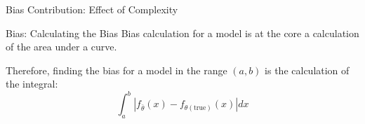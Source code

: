\documentclass{beamer}
\begin{document}
\begin{frame}{Bias Contribution: Effect of Complexity}
\end{frame}

\begin{frame}{Bias: Calculating the Bias}
Bias calculation for a model is at the core a calculation of the area under a curve. 

Therefore, finding the bias for a model in the range $(a,b)$ is the calculation of the integral: $$ \int_a^b |f_{\bar{\theta}}(x)-f_{\theta(\text{true})}(x)| dx $$
\end{frame}
\end{document}
